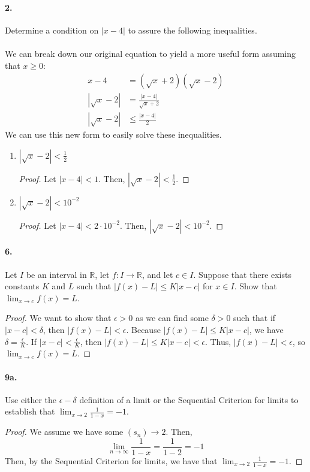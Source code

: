 \documentclass[12pt]{article}
\newcommand\R{\mathbb{R}}
\theoremstyle{remark}
\begin{document}
\paragraph{2.} Determine a condition on $|x - 4|$ to assure the following inequalities. \\\null\\
We can break down our original equation to yield a more useful form assuming that $x \geq 0$:
\begin{align*}
    x - 4 &= (\sqrt{x} + 2)(\sqrt{x} - 2) \\
    |\sqrt{x} - 2| &= \frac{|x - 4|}{\sqrt{x} + 2} \\
    |\sqrt{x} - 2| &\leq \frac{|x - 4|}{2}
\end{align*}
We can use this new form to easily solve these inequalities.
\begin{enumerate}[label=(\alph*)]
    \item $|\sqrt{x} - 2| < \frac{1}{2}$
    \begin{proof}
        Let $|x - 4| < 1$. Then, $|\sqrt{x} - 2| < \frac{1}{2}$.
    \end{proof}

    \item $|\sqrt{x} - 2| < 10^{-2}$
    \begin{proof}
        Let $|x - 4| < 2 \cdot 10^{-2}$. Then, $|\sqrt{x} - 2| < 10^{-2}$.
    \end{proof}
    
\end{enumerate}

\paragraph{6.} Let $I$ be an interval in $\R$, let $f: I \to \R$, and let $c \in I$. Suppose that there exists constants $K$ and $L$ such that $|f(x) - L| \leq K|x - c|$ for $x \in I$. Show that $\lim_{x \to c} f(x) = L$.
\begin{proof}
    We want to show that $\epsilon > 0$ as we can find some $\delta > 0$ such that if $|x - c| < \delta$, then $|f(x) - L| < \epsilon$. Because $|f(x) - L| \leq K|x - c|$, we have $\delta = \frac{\epsilon}{K}$. If $|x - c| < \frac{\epsilon}{K}$, then $|f(x) - L| \leq K|x - c| < \epsilon$. Thus, $|f(x) - L| < \epsilon$, so $\lim_{x \to c} f(x) = L$.
\end{proof}

\paragraph{9a.} Use either the $\epsilon-\delta$ definition of a limit or the Sequential Criterion for limits to establish that $\lim_{x \to 2} \frac{1}{1 - x} = -1$.
\begin{proof}
    We assume we have some $(s_n) \to 2$. Then, $$\lim_{n \to \infty} \frac{1}{1 - x} = \frac{1}{1 - 2} = -1$$ Then, by the Sequential Criterion for limits, we have that $\lim_{x \to 2} \frac{1}{1 - x} = -1$.
\end{proof}
\end{document}
